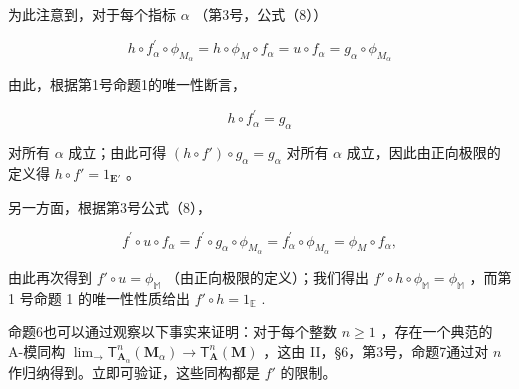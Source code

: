 为此注意到，对于每个指标 \(\alpha\) （第3号，公式（8））

\[
h \circ f _ {\alpha} ^ {\prime} \circ \phi_ {M _ {\alpha}} = h \circ \phi_ {M} \circ f _ {\alpha} = u \circ f _ {\alpha} = g _ {\alpha} \circ \phi_ {M _ {\alpha}}
\]

由此，根据第1号命题1的唯一性断言，

\[
h \circ f _ {\alpha} ^ {\prime} = g _ {\alpha}
\]

对所有 \(\alpha\) 成立；由此可得 \((h \circ f') \circ g_{\alpha} = g_{\alpha}\) 对所有 \(\alpha\) 成立，因此由正向极限的定义得 \(h \circ f' = 1_{\mathbf{E}'}\) 。

另一方面，根据第3号公式（8），

\[
f ^ {\prime} \circ u \circ f _ {\alpha} = f ^ {\prime} \circ g _ {\alpha} \circ \phi_ {M _ {\alpha}} = f _ {\alpha} ^ {\prime} \circ \phi_ {M _ {\alpha}} = \phi_ {M} \circ f _ {\alpha},
\]

由此再次得到 \(f' \circ u = \phi_{\mathbb{M}}\) （由正向极限的定义）；我们得出 \(f' \circ h \circ \phi_{\mathbb{M}} = \phi_{\mathbb{M}}\) ，而第 1 号命题 1 的唯一性性质给出 \(f' \circ h = 1_{\mathbb{E}}\) .

命题6也可以通过观察以下事实来证明：对于每个整数 \(n \geqslant 1\) ，存在一个典范的 A-模同构 \(\lim_{\longrightarrow} \mathsf{T}_{\mathbf{A}_{\alpha}}^{n}(\mathbf{M}_{\alpha}) \to \mathsf{T}_{\mathbf{A}}^{n}(\mathbf{M})\) ，这由 II，§6，第3号，命题7通过对 \(n\) 作归纳得到。立即可验证，这些同构都是 \(f'\) 的限制。

